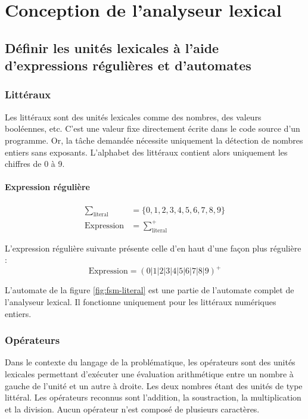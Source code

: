 \section{Conception de l'analyseur lexical}

\subsection{Définir les unités lexicales à l’aide d’expressions régulières
et d'automates}

\subsubsection{Littéraux}

Les littéraux sont des unités lexicales comme des nombres, des valeurs
booléennes, etc. C'est une valeur fixe directement écrite dans le code source
d'un programme. Or, la tâche demandée nécessite uniquement la détection de
nombres entiers sans exposants. L'alphabet des littéraux contient alors
uniquement les chiffres de 0 à 9.

\paragraph{Expression régulière}

\begin{align}
  \sum_{\textrm{literal}} &= \{0,1,2,3,4,5,6,7,8,9 \} \\
  \textrm{Expression} &= \sum^+_{\textrm{literal}}
\end{align}

L'expression régulière suivante présente celle d'en haut d'une façon plus
régulière :
\begin{equation}
  \textrm{Expression} = (0|1|2|3|4|5|6|7|8|9)^+
\end{equation}

L'automate de la figure \ref{fig:fsm-literal} est une partie de l'automate
complet de l'analyseur lexical. Il fonctionne uniquement pour les littéraux
numériques entiers.

\subsubsection{Opérateurs}

Dans le contexte du langage de la problématique, les opérateurs sont des
unités lexicales permettant d'exécuter une évaluation arithmétique entre un
nombre à gauche de l'unité et un autre à droite. Les deux nombres étant des
unités de type littéral. Les opérateurs reconnus sont l'addition, la
soustraction, la multiplication et la division. Aucun opérateur n'est composé
de plusieurs caractères.

